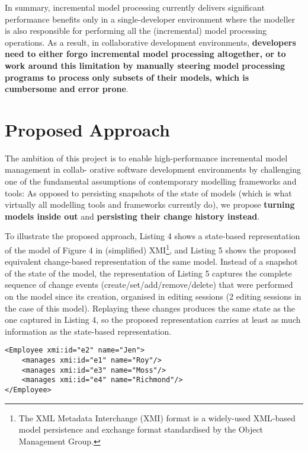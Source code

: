 \documentclass{llncs}
\begin{document}
In summary, incremental model processing currently delivers significant performance benefits only
in a single-developer environment where the modeller is also responsible for performing all the (incremental) model processing operations. As a result, in collaborative development environments,
\textbf{developers need to either forgo incremental model processing altogether, or to work around
this limitation by manually steering model processing programs to process only subsets of
their models, which is cumbersome and error prone}.

\section{Proposed Approach}
The ambition of this project is to enable high-performance incremental model management in collab-
orative software development environments by challenging one of the fundamental assumptions
of contemporary modelling frameworks and tools: As opposed to persisting snapshots of the state of models (which is what virtually all modelling tools and frameworks currently do), we propose \textbf{turning models inside out} and \textbf{persisting their change history instead}.

To illustrate the proposed approach, Listing 4 shows a state-based representation of the model
of Figure 4 in (simplified) XMI\footnote{The XML Metadata Interchange (XMI) format is a widely-used XML-based model persistence and exchange format standardised by the Object Management Group.}, and Listing 5 shows the proposed equivalent change-based representation of the same model. Instead of a snapshot of the state of the model, the representation of Listing 5 captures the complete sequence of change events (create/set/add/remove/delete) that were performed on the model since its creation, organised in editing sessions (2 editing sessions in the case of this model). Replaying these changes produces the same state as the one captured in Listing 4, so the proposed representation carries at least as much information as the state-based
representation.

\begin{lstlisting}[style=xmi,caption={State-based representation of the model of Figure 4 in (simplified) XMI.},label=xmimodel]
<Employee xmi:id="e2" name="Jen">
    <manages xmi:id="e1" name="Roy"/>
    <manages xmi:id="e3" name="Moss"/>
    <manages xmi:id="e4" name="Richmond"/>
</Employee>
\end{lstlisting}
\end{document}
